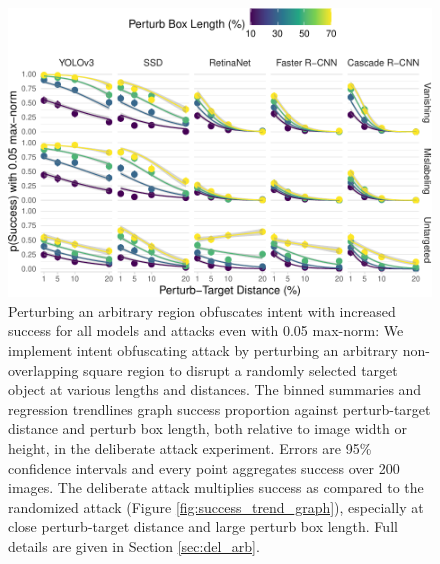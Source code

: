 \documentclass[
]{article}
\begin{document}
\begin{figure}[tb]

{\centering \includegraphics[width=1\linewidth]{imgs-normed/arbitrary_trend_graph-1} 

}

\caption{Perturbing an arbitrary region obfuscates intent with increased success for all models and attacks even with 0.05 max-norm:  We implement intent obfuscating attack by perturbing an arbitrary non-overlapping square region to disrupt a randomly selected target object at various lengths and distances. The binned summaries and regression trendlines graph success proportion against perturb-target distance and perturb box length, both relative to image width or height, in the deliberate attack experiment. Errors are 95\% confidence intervals and every point aggregates success over 200 images. The deliberate attack multiplies success as compared to the randomized attack (Figure \ref{fig:success_trend_graph}), especially at close perturb-target distance and large perturb box length. Full details are given in Section \ref{sec:del_arb}.}\label{fig:arbitrary_trend_graph}
\end{figure}

\begingroup\fontsize{9}{11}\selectfont
\end{document}
